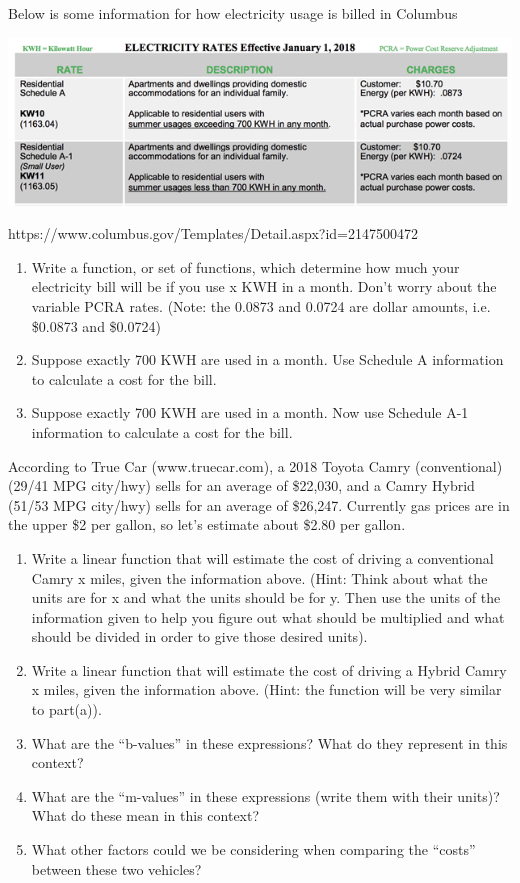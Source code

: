 \documentclass{ximera}
\begin{document}
\begin{exploration}
Below is some information for how electricity usage is billed in Columbus
\begin{image}
\includegraphics[width=6in]{electricity.png}
\end{image}
https://www.columbus.gov/Templates/Detail.aspx?id=2147500472 
\begin{enumerate}
\item Write a function, or set of functions, which determine how much your electricity bill will be if you use x KWH in a month.  Don't worry about the variable PCRA rates.
(Note: the 0.0873 and 0.0724 are dollar amounts, i.e. \$0.0873 and \$0.0724)
\item Suppose exactly 700 KWH are used in a month.  Use Schedule A information to calculate a cost for the bill.
\item Suppose exactly 700 KWH are used in a month.  Now use Schedule A-1 information to calculate a cost for the bill.
\end{enumerate} 
\end{exploration}
\begin{exploration}
According to True Car (www.truecar.com), a 2018 Toyota Camry (conventional) (29/41 MPG city/hwy) sells for an average of  \$22,030, and a Camry Hybrid (51/53 MPG city/hwy) sells for an average of \$26,247.  Currently gas prices are in the upper \$2 per gallon, so let's estimate about \$2.80 per gallon.
\begin{enumerate}
\item Write a linear function that will estimate the cost of driving a conventional Camry x miles, given the information above.  (Hint: Think about what the units are for x and what the units should be for y.  Then use the units of the information given to help you figure out what should be multiplied and what should be divided  in order to give those desired units).
\item Write a linear function that will estimate the cost of driving a Hybrid Camry x miles, given the information above.  (Hint: the function will be very similar to part(a)).
\item What are the ``b-values'' in these expressions?  What do they represent in this context?
\item What are the ``m-values'' in these expressions (write them with their units)?  What do these mean in this context?
\item What other factors could we be considering when comparing the ``costs'' between these two vehicles?
\end{enumerate}
\end{exploration}
\end{document}
